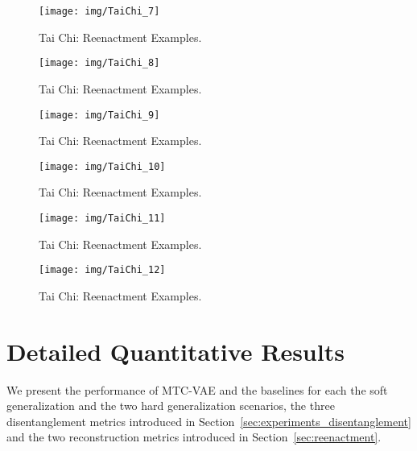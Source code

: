 \begin{figure}
\centering
\texttt{[image: img/TaiChi\_7]}
\caption{Tai Chi: Reenactment Examples.}
\label{fig:taichi7}
\end{figure}

\begin{figure}
\centering
\texttt{[image: img/TaiChi\_8]}
\caption{Tai Chi: Reenactment Examples.}
\label{fig:taichi8}
\end{figure}

\begin{figure}
\centering
\texttt{[image: img/TaiChi\_9]}
\caption{Tai Chi: Reenactment Examples.}
\label{fig:taichi9}
\end{figure}

\begin{figure}
\centering
\texttt{[image: img/TaiChi\_10]}
\caption{Tai Chi: Reenactment Examples.}
\label{fig:taichi10}
\end{figure}

\begin{figure}
\centering
\texttt{[image: img/TaiChi\_11]}
\caption{Tai Chi: Reenactment Examples.}
\label{fig:taichi11}
\end{figure}

\begin{figure}
\centering
\texttt{[image: img/TaiChi\_12]}
\caption{Tai Chi: Reenactment Examples.}
\label{fig:taichi12}
\end{figure}


\section{Detailed Quantitative Results}
\label{sec:detailed_results}

We present the performance of MTC-VAE and the baselines for each the soft generalization and the two hard generalization scenarios, \wrt the three disentanglement metrics introduced in Section~\ref{sec:experiments_disentanglement} and the two reconstruction metrics introduced in Section~\ref{sec:reenactment}.

